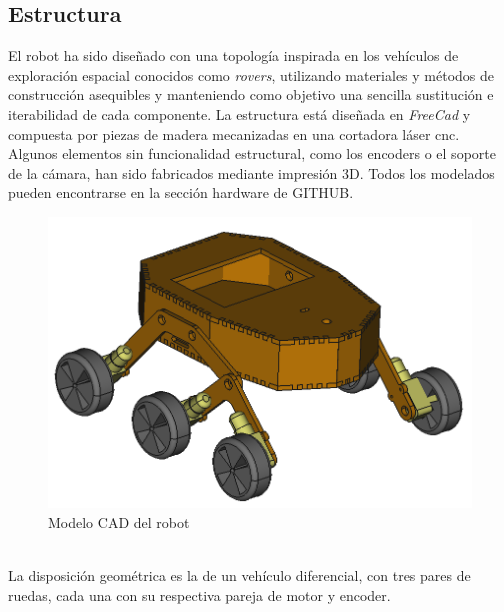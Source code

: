 \subsection{Estructura}
El robot ha sido diseñado con una topología inspirada en los vehículos de exploración espacial conocidos como \textit{rovers}, utilizando materiales y métodos de construcción asequibles y manteniendo como objetivo una sencilla sustitución e iterabilidad de cada componente. La estructura está diseñada en \textit{FreeCad} y compuesta por piezas de madera mecanizadas en una cortadora láser cnc.
Algunos elementos sin funcionalidad estructural, como los encoders o el soporte de la cámara, han sido fabricados mediante impresión 3D. Todos los modelados pueden encontrarse en la sección hardware de GITHUB.
\begin{figure}[h!]
	\centering
	\includegraphics[width=.6\textwidth]{images/wheele_stl}
	\caption{Modelo CAD del robot}
\end{figure}
\\
La disposición geométrica es la de un vehículo diferencial, con tres pares de ruedas, cada una con su respectiva pareja de motor y encoder.\\

